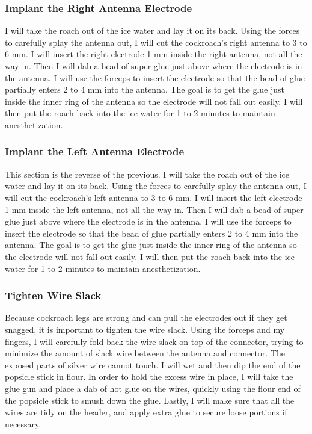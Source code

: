 \subsubsection{Implant the Right Antenna Electrode}

I will take the roach out of the ice water and lay it on its back. Using the forces to carefully splay the antenna out, I will cut the cockroach's right antenna to 3 to 6 mm. I will insert the right electrode 1 mm inside the right antenna, not all the way in. Then I will dab a bead of super glue just above where the electrode is in the antenna. I will use the forceps to insert the electrode so that the bead of glue partially enters 2 to 4 mm into the antenna. The goal is to get the glue just inside the inner ring of the antenna so the electrode will not fall out easily. I will then put the roach back into the ice water for 1 to 2 minutes to maintain anesthetization.

\subsubsection{Implant the Left Antenna Electrode}
 
This section is the reverse of the previous. I will take the roach out of the ice water and lay it on its back. Using the forces to carefully splay the antenna out, I will cut the cockroach's left antenna to 3 to 6 mm. I will insert the left electrode 1 mm inside the left antenna, not all the way in. Then I will dab a bead of super glue just above where the electrode is in the antenna. I will use the forceps to insert the electrode so that the bead of glue partially enters 2 to 4 mm into the antenna. The goal is to get the glue just inside the inner ring of the antenna so the electrode will not fall out easily. I will then put the roach back into the ice water for 1 to 2 minutes to maintain anesthetization.

\subsubsection{Tighten Wire Slack}

Because cockroach legs are strong and can pull the electrodes out if they get snagged, it is important to tighten the wire slack. Using the forceps and my fingers, I will carefully fold back the wire slack on top of the connector, trying to minimize the amount of slack wire between the antenna and connector. The exposed parts of silver wire cannot touch. I will wet and then dip the end of the popsicle stick in flour. In order to hold the excess wire in place, I will take the glue gun and place a dab of hot glue on the wires, quickly using the flour end of the popsicle stick to smush down the glue. Lastly, I will make sure that all the wires are tidy on the header, and apply extra glue to secure loose portions if necessary.

